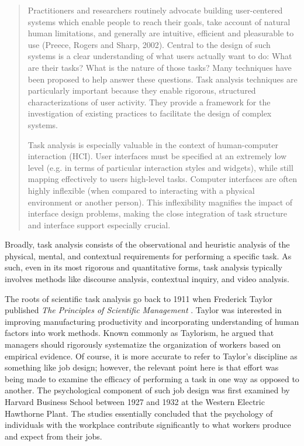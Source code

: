 \begin{quote}
Practitioners and researchers routinely advocate building user-centered systems which enable people to reach their goals, take account of natural human limitations, and generally are intuitive, efficient and pleasurable to use (Preece, Rogers and Sharp, 2002). Central to the design of such systems is a clear understanding of what users actually want to do: What are their tasks? What is the nature of those tasks? Many techniques have been proposed to help answer these questions. Task analysis techniques are particularly important because they enable rigorous, structured characterizations of user activity. They provide a framework for the investigation of existing practices to facilitate the design of complex systems.

Task analysis is especially valuable in the context of human-computer interaction (HCI). User interfaces must be specified at an extremely low level (e.g. in terms of particular interaction styles and widgets), while still mapping effectively to users high-level tasks. Computer interfaces are often highly inflexible (when compared to interacting with a physical environment or another person). This inflexibility magnifies the impact of interface design problems, making the close integration of task structure and interface support especially crucial. \cite{crystal2004}
\end{quote}

Broadly, task analysis consists of the observational and heuristic analysis of the physical, mental, and contextual requirements for performing a specific task. As such, even in its most rigorous and quantitative forms, task analysis typically involves methods like discourse analysis, contextual inquiry, and video analysis. 

The roots of scientific task analysis go back to 1911 when Frederick Taylor published \emph{The Principles of Scientific Management} \cite{crystal2004}. Taylor was interested in improving manufacturing productivity and incorporating understanding of human factors into work methods. Known commonly as Taylorism, he argued that managers should rigorously systematize the organization of workers based on empirical evidence. Of course, it is more accurate to refer to Taylor's discipline as something like job design; however, the relevant point here is that effort was being made to examine the efficacy of performing a task in one way as opposed to another. The psychological component of such job design was first examined by Harvard Business School between 1927 and 1932 at the Western Electric Hawthorne Plant. The studies essentially concluded that the psychology of individuals with the workplace contribute significantly to what workers produce and expect from their jobs.

